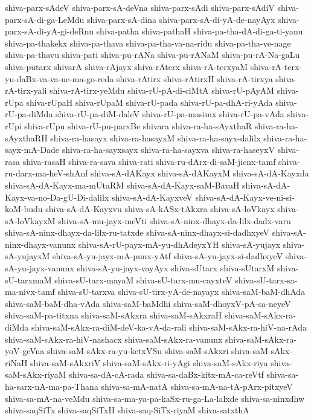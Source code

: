 {shiva-parx-sAdeV
shiva-parx-sA-deVna
shiva-parx-sAdi
shiva-parx-sAdiV
shiva-parx-sA-di-ga-LeMdu
shiva-parx-sA-dina
shiva-parx-sA-di-yA-de-nayAyx
shiva-parx-sA-di-yA-gi-deRnu
shiva-patha
shiva-pathaH
shiva-pa-tha-dA-di-ga-ti-yanu
shiva-pa-thakekx
shiva-pa-thava
shiva-pa-tha-va-na-ridu
shiva-pa-tha-ve-nage
shiva-pa-thavu
shiva-pati
shiva-pu-rANa
shiva-pu-rANaM
shiva-pu-rA-Na-gaLu
shiva-putarx
shivarA
shiva-rAjayx
shiva-rAterx
shiva-rA-terxyaM
shiva-rA-terx-yu-daBx-va-va-ne-ma-go-reda
shiva-rAtirx
shiva-rAtirxH
shiva-rA-tirxya
shiva-rA-tirx-yali
shiva-rA-tirx-yeMdu
shiva-rU-pA-di-ciMtA
shiva-rU-pAyAM
shiva-rUpa
shiva-rUpaH
shiva-rUpaM
shiva-rU-pada
shiva-rU-pa-dhA-ri-yAda
shiva-rU-pa-diMda
shiva-rU-pa-diM-daleV
shiva-rU-pa-masimx
shiva-rU-pa-vAda
shiva-rUpi
shiva-rUpu
shiva-rU-pu-parxBe
shivara
shiva-ra-ha-sAyxthaR
shiva-ra-ha-sAyxthaRH
shiva-ra-hasayx
shiva-ra-hasayxM
shiva-ra-ha-sayx-dalilx
shiva-ra-ha-sayx-mA-Dade
shiva-ra-ha-sayxsayx
shiva-ra-ha-sayxva
shiva-ra-haseyxV
shiva-rasa
shiva-rasaH
shiva-ra-sava
shiva-rati
shiva-ru-dArx-di-saM-jicnx-tamf
shiva-ru-darx-ma-heV-shAnf
shiva-sA-dAKayx
shiva-sA-dAKayxM
shiva-sA-dA-Kayxda
shiva-sA-dA-Kayx-ma-mUtaRM
shiva-sA-dA-Kayx-saM-BavaH
shiva-sA-dA-Kayx-va-no-Da-gU-Di-dalilx
shiva-sA-dA-KayxveV
shiva-sA-dA-Kayx-ve-ni-si-koM-budu
shiva-sA-dA-Kayxvu
shiva-sA-kASx-tAkxra
shiva-sA-loVkayx
shiva-sA-loVkayxM
shiva-sA-mu-jayx-meVti
shiva-sA-ninx-dhayx-da-lilx-dadx-varu
shiva-sA-ninx-dhayx-da-lilx-ru-tatxde
shiva-sA-ninx-dhayx-si-dadhxyeV
shiva-sA-ninx-dhayx-vanunx
shiva-sA-rU-payx-mA-yu-dhAdeyxYH
shiva-sA-yujayx
shiva-sA-yujayxM
shiva-sA-yu-jayx-mA-punx-yAtf
shiva-sA-yu-jayx-si-dadhxyeV
shiva-sA-yu-jayx-vanunx
shiva-sA-yu-jayx-vayAyx
shiva-sUtarx
shiva-sUtarxM
shiva-sU-tarxmaM
shiva-sU-tarx-mayaM
shiva-sU-tarx-mu-cayxteV
shiva-sU-tarx-sa-ma-nivx-tamf
shiva-sU-tarxva
shiva-sU-tirx-yA-de-nayayx
shiva-saM-baM-dhAda
shiva-saM-baM-dha-vAda
shiva-saM-baMdhi
shiva-saM-dhoyxV-pA-sa-neyeV
shiva-saM-pa-titxna
shiva-saM-sAkxra
shiva-saM-sAkxraH
shiva-saM-sAkx-ra-diMda
shiva-saM-sAkx-ra-diM-deV-ka-vA-da-rali
shiva-saM-sAkx-ra-hiV-na-rAda
shiva-saM-sAkx-ra-hiV-nashacx
shiva-saM-sAkx-ra-vanunx
shiva-saM-sAkx-ra-yoV-geVna
shiva-saM-sAkx-ra-yu-ketxVSu
shiva-saM-sAkxri
shiva-saM-sAkx-riNaH
shiva-saM-sAkxriV
shiva-saM-sAkx-ri-yAgi
shiva-saM-sAkx-riya
shiva-saM-sAkx-riyaM
shiva-sa-dA-cA-rada
shiva-sa-daBx-kitx-mA-ca-reVtf
shiva-sa-ha-sarx-nA-ma-pa-Thana
shiva-sa-mA-natA
shiva-sa-mA-na-tA-pArx-pitxyeV
shiva-sa-mA-na-veMdu
shiva-sa-ma-ya-pa-kaSx-ru-ga-La-lalxde
shiva-sa-ninxdhw
shiva-saqSiTx
shiva-saqSiTxH
shiva-saq-SiTx-riyaM
shiva-satxthA
}
